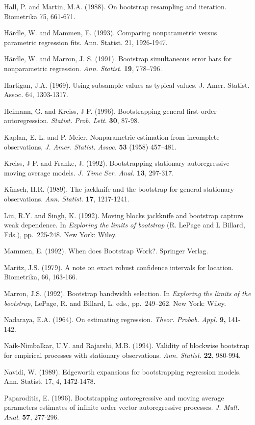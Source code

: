 \documentclass[]{book}
\theoremstyle{definition}
\theoremstyle{definition}
\theoremstyle{definition}
\theoremstyle{remark}
\begin{document}
Hall, P. and Martin, M.A. (1988). On bootstrap resampling and iteration.
Biometrika 75, 661-671.

Härdle, W. and Mammen, E. (1993). Comparing nonparametric versus
parametric regression fits. Ann. Statist. 21, 1926-1947.

Härdle, W. and Marron, J. S. (1991). Bootstrap simultaneous error bars
for nonparametric regression. \emph{Ann. Statist.} \textbf{19},
778--796.

Hartigan, J.A. (1969). Using subsample values as typical values. J.
Amer. Statist. Assoc. 64, 1303-1317.

Heimann, G. and Kreiss, J-P. (1996). Bootstrapping general first order
autoregression. \emph{Statist. Prob. Lett.} \textbf{30}, 87-98.

Kaplan, E. L. and P. Meier, Nonparametric estimation from incomplete
observations, \emph{J. Amer. Statist. Assoc.} \textbf{53} (1958)
457--481.

Kreiss, J-P. and Franke, J. (1992). Bootstrapping stationary
autoregressive moving average models. \emph{J. Time Ser. Anal.}
\textbf{13}, 297-317.

Künsch, H.R. (1989). The jackknife and the bootstrap for general
stationary observations. \emph{Ann. Statist.} \textbf{17}, 1217-1241.

Liu, R.Y. and Singh, K. (1992). Moving blocks jackknife and bootstrap
capture weak dependence. In \emph{Exploring the limits of bootstrap} (R.
LePage and L Billard, Eds.), pp.~225-248. New York: Wiley.

Mammen, E. (1992). When does Bootstrap Work?. Springer Verlag.

Maritz, J.S. (1979). A note on exact robust confidence intervals for
location. Biometrika, 66, 163-166.

Marron, J.S. (1992). Bootstrap bandwidth selection. In \emph{Exploring
the limits of the bootstrap}, LePage, R. and Billard, L. eds.,
pp.~249--262. New York: Wiley.

Nadaraya, E.A. (1964). On estimating regression. \emph{Theor. Probab.
Appl.} \textbf{9,} 141-142.

Naik-Nimbalkar, U.V. and Rajarshi, M.B. (1994). Validity of blockwise
bootstrap for empirical processes with stationary observations.
\emph{Ann. Statist.} \textbf{22}, 980-994.

Navidi, W. (1989). Edgeworth expansions for bootstrapping regression
models. Ann. Statist. 17, 4, 1472-1478.

Paparoditis, E. (1996). Bootstrapping autoregressive and moving average
parameters estimates of infinite order vector autoregressive processes.
\emph{J. Mult. Anal.} \textbf{57}, 277-296.
\end{document}
